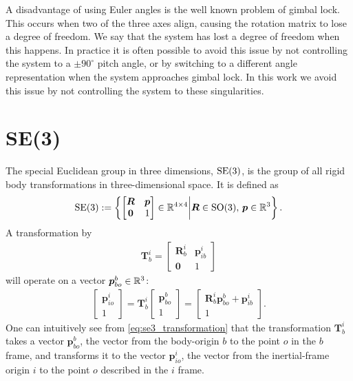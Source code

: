 A disadvantage of using Euler angles is the well known problem of gimbal lock.
This occurs when two of the three axes align, causing the rotation matrix to
lose a degree of freedom. We say that the system has lost a degree of freedom
when this happens. In practice it is often possible to avoid this issue by not
controlling the system to a $\pm90^\circ$ pitch angle, or by switching to a
different angle representation when the system approaches gimbal lock. In this
work we avoid this issue by not controlling the system to these singularities.

\section{SE(3)}

The special Euclidean group in three dimensions, $\operatorname{SE}(3)$, is the group of all
rigid body transformations in three-dimensional space. It is defined as
\begin{align}
    \operatorname{SE}(3) := \left\{ \begin{bmatrix}
        \bm{R} & \bm{p} \\
        \bm{0} & 1
    \end{bmatrix}
        \in \mathbb{R}^{4 \times 4} \middle| \bm{R} \in \operatorname{SO}(3), \, \bm{p} \in \mathbb{R}^3
    \right\}.
\end{align}
A transformation by 
\begin{align}
    \bm{T}_b^i = \begin{bmatrix}
        \bm{R}_{b}^i & \bm{p}_{ib}^i \\
        \bm{0} & 1
    \end{bmatrix}
\end{align}
will operate on a vector $\bm{p}_{bo}^b \in \mathbb{R}^3$:
\begin{align}
    \begin{bmatrix}
        \bm{p}_{io}^i  \\
        1
    \end{bmatrix}
    =
    \bm{T}_b^i \begin{bmatrix}
        \bm{p}_{bo}^b \\
        1
    \end{bmatrix}
    =
    \begin{bmatrix}
        \bm{R}_{b}^i \bm{p}_{bo}^b + \bm{p}_{ib}^i \\
        1
    \end{bmatrix}.
    \label{eq:se3_transformation}
\end{align}
One can intuitively see from \autoref{eq:se3_transformation} that the transformation
$\bm{T}_b^i$
takes a vector $\bm{p}_{bo}^b$, the vector from the body-origin $b$ to the point $o$
in the $b$ frame, and transforms it to the vector $\bm{p}_{io}^i$, the vector from
the inertial-frame origin $i$ to the point $o$ described in the $i$ frame.


